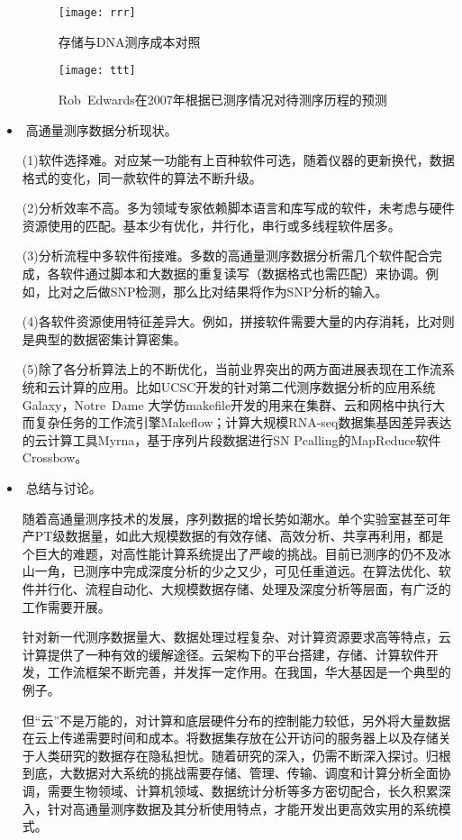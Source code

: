\documentclass{article}
\begin{document}
\begin{itemize}
    
    
    \par
    
    
    \begin{figure}[h!]
    	\centering
    	\texttt{[image: rrr]}
    	\caption{存储与DNA测序成本对照}
    	\label{fig:rrr}
    \end{figure}


    \begin{figure}[h!]
    \centering
    \texttt{[image: ttt]}
    \caption{Rob Edwards在2007年根据已测序情况对待测序历程的预测}
    \label{fig:ttt}
    \end{figure}
    
    
    
    \item高通量测序数据分析现状。\par
    (1)软件选择难。对应某一功能有上百种软件可选，随着仪器的更新换代，数据格式的变化，同一款软件的算法不断升级。\par
    (2)分析效率不高。多为领域专家依赖脚本语言和库写成的软件，未考虑与硬件资源使用的匹配。基本少有优化，并行化，串行或多线程软件居多。\par
    (3)分析流程中多软件衔接难。多数的高通量测序数据分析需几个软件配合完成，各软件通过脚本和大数据的重复读写（数据格式也需匹配）来协调。例如，比对之后做SNP检测，那么比对结果将作为SNP分析的输入。\par
    (4)各软件资源使用特征差异大。例如，拼接软件需要大量的内存消耗，比对则是典型的数据密集计算密集。\par (5)除了各分析算法上的不断优化，当前业界突出的两方面进展表现在工作流系统和云计算的应用。比如UCSC开发的针对第二代测序数据分析的应用系统Galaxy，Notre Dame 大学仿makefile开发的用来在集群、云和网格中执行大而复杂任务的工作流引擎Makeflow；计算大规模RNA-seq数据集基因差异表达的云计算工具Myrna，基于序列片段数据进行SN Pcalling的MapReduce软件Crossbow。\par
    \item总结与讨论。\par
    随着高通量测序技术的发展，序列数据的增长势如潮水。单个实验室甚至可年产PT级数据量，如此大规模数据的有效存储、高效分析、共享再利用，都是个巨大的难题，对高性能计算系统提出了严峻的挑战。目前已测序的仍不及冰山一角，已测序中完成深度分析的少之又少，可见任重道远。在算法优化、软件并行化、流程自动化、大规模数据存储、处理及深度分析等层面，有广泛的工作需要开展。\par
    针对新一代测序数据量大、数据处理过程复杂、对计算资源要求高等特点，云计算提供了一种有效的缓解途径。云架构下的平台搭建，存储、计算软件开发，工作流框架不断完善，并发挥一定作用。在我国，华大基因是一个典型的例子\citep{mess}。\par
    但“云”不是万能的，对计算和底层硬件分布的控制能力较低，另外将大量数据在云上传递需要时间和成本。将数据集存放在公开访问的服务器上以及存储关于人类研究的数据存在隐私担忧。随着研究的深入，仍需不断深入探讨。归根到底，大数据对大系统的挑战需要存储、管理、传输、调度和计算分析全面协调，需要生物领域、计算机领域、数据统计分析等多方密切配合，长久积累深入，针对高通量测序数据及其分析使用特点，才能开发出更高效实用的系统模式。\par
\end{itemize}
\end{document}
